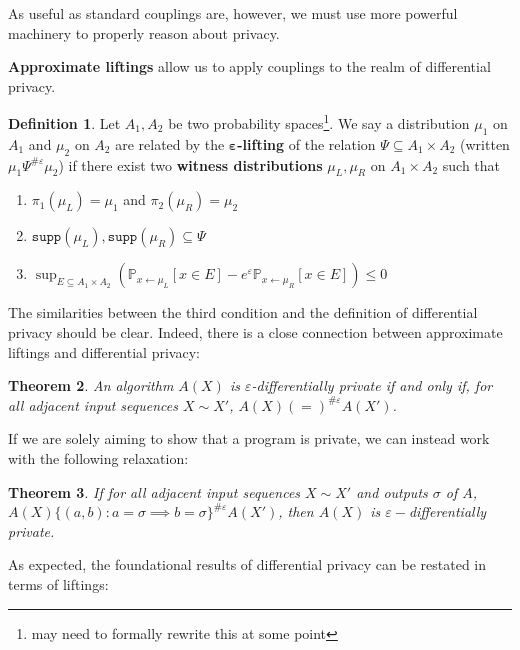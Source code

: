 \documentclass[12pt]{article}
\newcommand{\PP}{\mathbb{P}}
\newcommand{\supp}{\texttt{supp}}
\newtheorem{thm}{Theorem}[section]
\theoremstyle{definition}
\newtheorem{defn}[thm]{Definition}
\begin{document}
As useful as standard couplings are, however, we must use more powerful machinery to properly reason about privacy.

\textbf{Approximate liftings} \cite{BartheOlmedo2013,bartheKopfOlmedo2012ProbabilisticRelationalReasoningforDifferentialPriv,HsuThesis2017,BartheEtAl2016} allow us to apply couplings to the realm of differential privacy. 

\begin{defn}
    Let $A_1, A_2$ be two probability spaces\footnote{may need to formally rewrite this at some point}. We say a distribution $\mu_1$ on $A_1$ and $\mu_2$ on $A_2$ are related by the $\mathbf{\varepsilon}$\textbf{-lifting} of the relation $\Psi\subseteq A_1\times A_2$ (written $\mu_1\Psi^{\#\varepsilon}\mu_2$) if there exist two \textbf{witness distributions} $\mu_L, \mu_R$ on $A_1\times A_2$ such that\begin{enumerate}
        \item $\pi_1(\mu_L) = \mu_1$ and $\pi_2(\mu_R) = \mu_2$
        \item $\supp(\mu_L), \supp(\mu_R)\subseteq \Psi$
        \item $\sup_{E\subseteq A_1\times A_2}(\PP_{x\gets \mu_L}[x\in E]- e^\varepsilon \PP_{x\gets \mu_R}[x\in E])\leq 0$
    \end{enumerate}
\end{defn}

The similarities between the third condition and the definition of differential privacy should be clear. Indeed, there is a close connection between approximate liftings and differential privacy:

\begin{thm}
    An algorithm $A(X)$ is $\varepsilon$-differentially private if and only if, for all adjacent input sequences $X\sim X'$, $A(X)(=)^{\#\varepsilon}A(X')$.
\end{thm}

If we are solely aiming to show that a program is private, we can instead work with the following relaxation: 

\begin{thm}\label{implicationcouplingthm}
    If for all adjacent input sequences $X\sim X'$ and outputs $\sigma$ of $A$, $A(X)\{(a, b): a=\sigma\implies b=\sigma\}^{\#\varepsilon}A(X')$, then $A(X)$ is $\varepsilon-$differentially private.
\end{thm}

As expected, the foundational results of differential privacy can be restated in terms of liftings:
\end{document}

